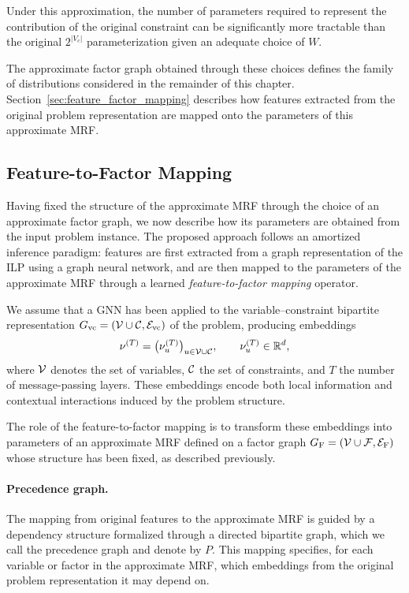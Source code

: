 Under this approximation, the number of parameters required to represent the contribution of the original constraint can be significantly more tractable than the original $2^{|V_c|}$ parameterization given an adequate choice of $W$.

The approximate factor graph obtained through these choices defines the family of distributions considered in the remainder of this chapter. Section~\ref{sec:feature_factor_mapping} describes how features extracted from the original problem representation are mapped onto the parameters of this approximate MRF.



\subsection{Feature-to-Factor Mapping}

Having fixed the structure of the approximate MRF through the choice of an approximate factor graph, we now describe how its parameters are obtained from the input problem instance. The proposed approach follows an amortized inference paradigm: features are first extracted from a graph representation of the ILP using a graph neural network, and are then mapped to the parameters of the approximate MRF through a learned \emph{feature-to-factor mapping} operator.

We assume that a GNN has been applied to the variable--constraint bipartite representation $G_{\mathrm{vc}}=(\mathcal{V} \cup \mathcal{C}, \mathcal{E}_{\mathrm{vc}})$ of the problem, producing embeddings
\begin{equation}
\nu^{(T)} = \bigl( \nu^{(T)}_u \bigr)_{u \in \mathcal{V} \cup \mathcal{C}}, \qquad \nu^{(T)}_u \in \mathbb{R}^d,
\end{equation}
where $\mathcal{V}$ denotes the set of variables, $\mathcal{C}$ the set of constraints, and $T$ the number of message-passing layers. These embeddings encode both local information and contextual interactions induced by the problem structure.

The role of the feature-to-factor mapping is to transform these embeddings into parameters of an approximate MRF defined on a factor graph $G_{\mathrm{F}}=(\mathcal{V} \cup \mathcal{F},\mathcal{E}_{\mathrm{F}})$ whose structure has been fixed, as described previously.

\paragraph{Precedence graph.}
The mapping from original features to the approximate MRF is guided by a dependency structure formalized through a directed bipartite graph, which we call the precedence graph and denote by $P$. This mapping specifies, for each variable or factor in the approximate MRF, which embeddings from the original problem representation it may depend on.


